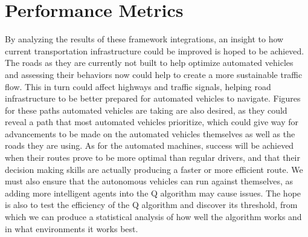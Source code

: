 \documentclass[a4paper, 11pt]{article}
\begin{document}
\section*{Performance Metrics}
By	analyzing	the	results	of	these	framework	integrations,	an	insight	to	how	current	transportation	
infrastructure	could	be	improved is	hoped	to	be	achieved.	The	roads	as	they	are	currently not	built	to	help	
optimize	automated	vehicles	and	assessing	their	behaviors	now	could	help	to	create	a	more	sustainable	traffic	
flow.	This	in	turn	could	affect	highways	and	traffic	signals,	helping	road	infrastructure	to	be	better	prepared	for	
automated	vehicles	to	navigate.	Figures	for	these	paths	automated	vehicles	are	taking	are	also	desired,	as	they	
could	reveal	a	path	that	most	automated	vehicles	prioritize,	which	could	give	way	for	advancements to	be	made	
on	the	automated	vehicles	themselves	as	well	as	the	roads	they	are	using.	
As	for	the	automated	machines,	success	will	be	achieved	when	their	routes	prove	to	be	more	optimal	
than	regular drivers,	and	that	their	decision	making	skills	are	actually	producing	a	faster	or	more	efficient	route.	
We	must	also	ensure	that	the	autonomous	vehicles	can	run	against	themselves,	as	adding	more	intelligent	agents	
into	the	Q	algorithm	may	cause	issues.	The	hope	is	also	to	test	the	efficiency	of	the	Q	algorithm	and	discover	its	
threshold,	from	which	we	can	produce	a	statistical analysis	of	how	well	the	algorithm	works	and	in	what	
environments	it	works	best.
\end{document}
